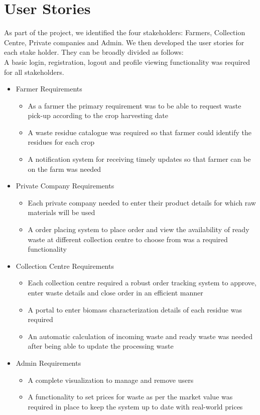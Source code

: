 \documentclass[conference]{IEEEtran}
\begin{document}
\section{User Stories}
As part of the project, we identified the four stakeholders: Farmers, Collection Centre, Private companies and Admin. We then developed the user stories for each stake holder. They can be broadly divided as follows: \\
A basic login, registration, logout and profile viewing functionality was required for all stakeholders.
\begin{itemize}
\item Farmer Requirements
   \begin{itemize}
       \item As a farmer the primary requirement was to be able to request waste pick-up according to the crop harvesting date 
       \item A waste residue catalogue was required so that farmer could identify the residues for each crop 
       \item A notification system for receiving timely updates so that farmer can be on the farm was needed 
   \end{itemize}
\item Private Company Requirements
\begin{itemize}
    \item Each private company needed to enter their product details for which raw materials will be used 
    \item A order placing system to place order and view the availability of ready waste at different collection centre to choose from was a required functionality 
\end{itemize}
\item Collection Centre Requirements 
\begin{itemize}
    \item Each collection centre required a robust order tracking system to approve, enter waste details and close order in an efficient manner 
    \item A portal to enter biomass characterization details of each residue was required 
    \item An automatic calculation of incoming waste and ready waste was needed after being able to update the processing waste 
\end{itemize}
\item Admin Requirements
\begin{itemize}
    \item A complete visualization to manage and remove users 
    \item A functionality to set prices for waste as per the market value was required in place to keep the system up to date with real-world prices
\end{itemize}
\end{itemize}
\end{document}
